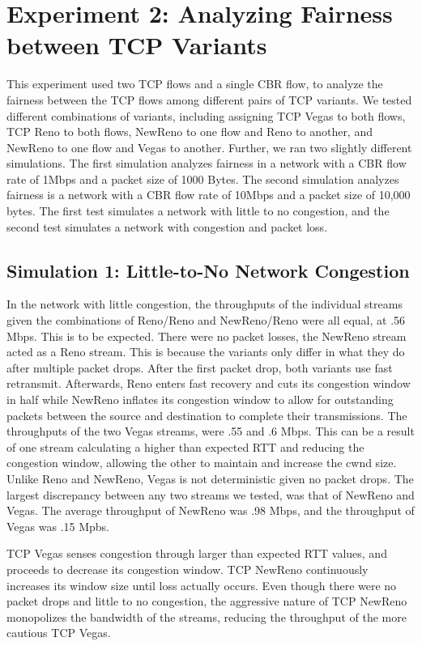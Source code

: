 \section{Experiment 2: Analyzing Fairness between TCP Variants}

This experiment used two TCP flows and a single CBR flow, to analyze the fairness between the TCP flows among different pairs of TCP variants. We tested different combinations of variants, including assigning TCP Vegas to both flows, TCP Reno to both flows, NewReno to one flow and Reno to another, and NewReno to one flow and Vegas to another. Further, we ran two slightly different simulations. The first simulation analyzes fairness in a network with a CBR flow rate of 1Mbps and a packet size of 1000 Bytes. The second simulation analyzes fairness is a network with a CBR flow rate of 10Mbps and a packet size of 10,000 bytes. The first test simulates a network with little to no congestion, and the second test simulates a network with congestion and packet loss.

\subsection{Simulation 1: Little-to-No Network Congestion}

In the network with little congestion, the throughputs of the individual streams given the combinations of Reno/Reno and NewReno/Reno were all equal, at .56 Mbps. This is to be expected. There were no packet losses, the NewReno stream acted as a Reno stream. This is because the variants only differ in what they do after multiple packet drops. After the first packet drop, both variants use fast retransmit. Afterwards, Reno enters fast recovery and cuts its congestion window in half while NewReno inflates its congestion window to allow for outstanding packets between the source and destination to complete their transmissions. The throughputs of the two Vegas streams, were .55 and .6 Mbps. This can be a result of one stream calculating a higher than expected RTT and reducing the congestion window, allowing the other to maintain and increase the cwnd size. Unlike Reno and NewReno, Vegas is not deterministic given no packet drops. The largest discrepancy between any two streams we tested, was that of NewReno and Vegas. The average throughput of NewReno was .98 Mbps, and the throughput of Vegas was .15 Mpbs. 

TCP Vegas senses congestion through larger than expected RTT values, and proceeds to decrease its congestion window. TCP NewReno continuously increases its window size until loss actually occurs. Even though there were no packet drops and little to no congestion, the aggressive nature of TCP NewReno monopolizes the bandwidth of the streams, reducing the throughput of the more cautious TCP Vegas.

